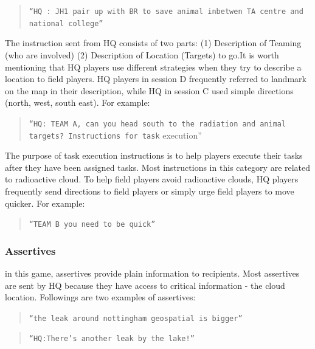 \begin{quote}
\texttt{``HQ : JH1 pair up with BR to save animal inbetwen TA centre and national college''}\\
\end{quote}

The instruction sent from HQ consists of two parts: (1) Description of Teaming (who are involved) (2) Description of Location (Targets) to go.It is worth mentioning that HQ players use different strategies when they try to describe a location to field players. HQ players in session D frequently referred to landmark on the map in their description, while HQ in session C used simple directions (north, west, south east). For example:\\

\begin{quote}
\texttt{``HQ: TEAM A, can you head south to the radiation and animal targets? Instructions for task} execution''\\
\end{quote}

The purpose of task execution instructions is to help players execute their tasks after they have been assigned tasks. Most instructions in this category are related to radioactive cloud. To help field players avoid radioactive clouds, HQ players frequently send directions to field players or simply urge field players to move quicker. For example:

\begin{quote}
\texttt{``TEAM B you need to be quick''} \\
\end{quote}

\subsubsection{Assertives}

in this game, assertives provide plain information to recipients. Most assertives are sent by HQ because they have access to critical information - the cloud location. Followings are two examples of assertives:\\

\begin{quote}
\texttt{``the leak around nottingham geospatial is bigger''}\\
\end{quote}

\begin{quote}
\texttt{``HQ:There's another leak by the lake!''}\\
\end{quote}

